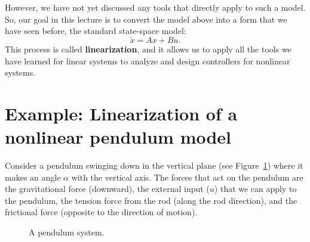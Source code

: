 \documentclass{ee122_notes}
\begin{document}
However, we have not yet discussed any tools that directly apply to such a model. So, our goal in this lecture is to convert the model above into a form that we have seen before, the standard state-space model:
\[
\dot x = Ax + Bu.
\]
This process is called \textbf{linearization}, and it allows us to apply all the tools we have learned for linear systems to analyze and design controllers for nonlinear systems.
\section{Example: Linearization of a nonlinear pendulum model}
Consider a pendulum swinging down in the vertical plane (see Figure~\ref{fig:pendulum}) where it makes an angle $\alpha$ with the vertical axis. The forces that act on the pendulum are the gravitational force (downward), the external input ($u$) that we can apply to the pendulum, the tension force from the rod (along the rod direction), and the frictional force (opposite to the direction of motion).
\begin{figure}[h]
    \centering
    \caption{A pendulum system.}
    \label{fig:pendulum}
\end{figure}
\end{document}
